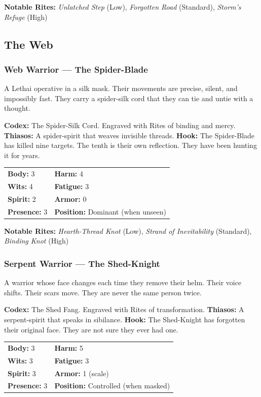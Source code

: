 \textbf{Notable Rites:} \textit{Unlatched Step} (Low), \textit{Forgotten Road} (Standard), \textit{Storm's Refuge} (High)

\subsection{The Web}

\subsubsection{Web Warrior — The Spider-Blade}

A Lethai operative in a silk mask. Their movements are precise, silent, and impossibly fast. They carry a spider-silk cord that they can tie and untie with a thought.

\textbf{Codex:} The Spider-Silk Cord. Engraved with Rites of binding and mercy.
\textbf{Thiasos:} A spider-spirit that weaves invisible threads.
\textbf{Hook:} The Spider-Blade has killed nine targets. The tenth is their own reflection. They have been hunting it for years.

\begin{tabular}{ll}
\textbf{Body:} 3 & \textbf{Harm:} 4 \\
\textbf{Wits:} 4 & \textbf{Fatigue:} 3 \\
\textbf{Spirit:} 2 & \textbf{Armor:} 0 \\
\textbf{Presence:} 3 & \textbf{Position:} Dominant (when unseen) \\
\end{tabular}

\textbf{Notable Rites:} \textit{Hearth-Thread Knot} (Low), \textit{Strand of Inevitability} (Standard), \textit{Binding Knot} (High)

\subsubsection{Serpent Warrior — The Shed-Knight}

A warrior whose face changes each time they remove their helm. Their voice shifts. Their scars move. They are never the same person twice.

\textbf{Codex:} The Shed Fang. Engraved with Rites of transformation.
\textbf{Thiasos:} A serpent-spirit that speaks in sibilance.
\textbf{Hook:} The Shed-Knight has forgotten their original face. They are not sure they ever had one.

\begin{tabular}{ll}
\textbf{Body:} 3 & \textbf{Harm:} 5 \\
\textbf{Wits:} 3 & \textbf{Fatigue:} 3 \\
\textbf{Spirit:} 3 & \textbf{Armor:} 1 (scale) \\
\textbf{Presence:} 3 & \textbf{Position:} Controlled (when masked) \\
\end{tabular}

